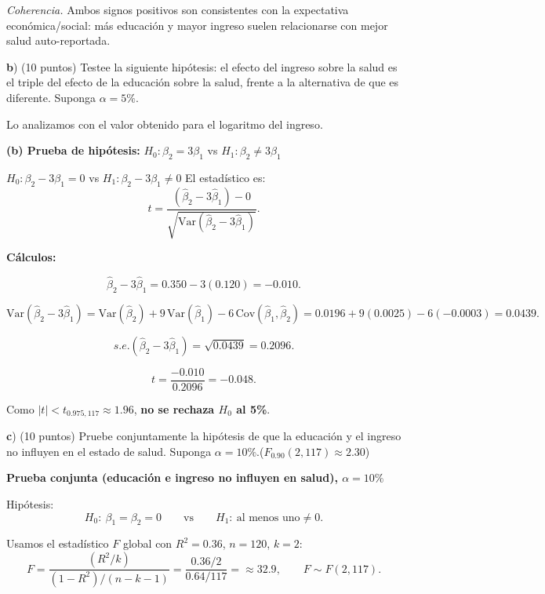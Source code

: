 \documentclass[10pt,a4paper]{article}
\begin{document}
\begin{enumerate}
\begin{flushleft}
\emph{Coherencia.} Ambos signos positivos son consistentes con la expectativa económica/social: más educación y mayor ingreso suelen relacionarse con mejor salud auto-reportada.


\color{black}


\vspace{0.5em}
\textbf b) (10 puntos) Testee la siguiente hipótesis: el efecto del ingreso sobre la salud es el triple del efecto de la educación sobre la salud, frente a la alternativa de que es diferente. Suponga $\alpha = 5\%$.

\color{blue}

Lo analizamos con el valor obtenido para el logaritmo del ingreso.

\textbf{(b) Prueba de hipótesis: } 
$H_0: \beta_2 = 3\beta_1$ 
\quad vs \quad 
$H_1: \beta_2 \neq 3\beta_1$

$H_0: \beta_2 - 3\beta_1=0$ 
\quad vs \quad 
$H_1: \beta_2 - 3\beta_1\neq 0$
\medskip
El estadístico es:
\[
t = \frac{(\hat{\beta}_2 - 3\hat{\beta}_1) - 0}
{\sqrt{\mathrm{Var}(\hat{\beta}_2 - 3\hat{\beta}_1)}}.
\]

\textbf{Cálculos:}

\[
\hat{\beta}_2 - 3\hat{\beta}_1 = 0.350 - 3(0.120) = -0.010.
\]

\[
\mathrm{Var}(\hat{\beta}_2 - 3\hat{\beta}_1)
= \mathrm{Var}(\hat{\beta}_2)
+ 9\,\mathrm{Var}(\hat{\beta}_1)
- 6\,\mathrm{Cov}(\hat{\beta}_1,\hat{\beta}_2)
= 0.0196 + 9(0.0025) - 6(-0.0003) = 0.0439.
\]

\[
s.e.(\hat{\beta}_2 - 3\hat{\beta}_1)
= \sqrt{0.0439} = 0.2096.
\]

\[
t = \frac{-0.010}{0.2096} = -0.048.
\]

Como $|t| < t_{0.975,117} \approx 1.96$, \textbf{no se rechaza $H_0$ al 5\%}.
\color{black}

\vspace{0.5em}
\textbf c) (10 puntos) Pruebe conjuntamente la hipótesis de que la educación y el ingreso no influyen en el estado de salud. Suponga $\alpha = 10\%$.($F_{0.90}(2,117) \approx 2.30$)
\color{blue}

\textbf{Prueba conjunta (educación e ingreso no influyen en salud), $\alpha=10\%$}

\medskip
Hipótesis:
\[
H_0:\ \beta_1=\beta_2=0
\qquad \text{vs} \qquad
H_1:\ \text{al menos uno}\neq 0.
\]

Usamos el estadístico $F$ global con $R^2=0.36$, $n=120$, $k=2$:
\[
F=\frac{(R^2/k)}{(1-R^2)/(n-k-1)}
=\frac{0.36/2}{0.64/117}
=\approx 32.9,
\qquad F \sim F(2,117).
\]


\end{flushleft}
\end{enumerate}
\end{document}
